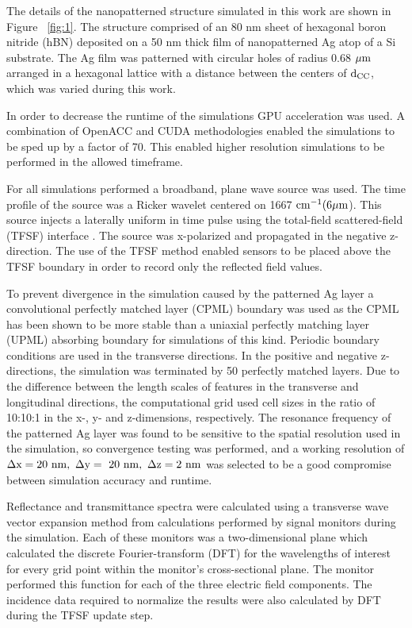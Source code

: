 \documentclass[12pt]{report}
\begin{document}
    The details of the nanopatterned structure simulated in this work are shown in Figure ~\ref{fig:1}. The structure comprised of an 80 nm sheet of hexagonal boron nitride (hBN) deposited on a 50 nm thick film of nanopatterned Ag atop of a Si substrate. The Ag film was patterned with circular holes of radius 0.68 $\rm \mu m$ arranged in a hexagonal lattice with a distance between the centers of $\rm d_{CC}$, which was varied during this work.

    In order to decrease the runtime of the simulations GPU acceleration was used. A combination of OpenACC and CUDA \cite{PGI:20} methodologies enabled the simulations to be sped up by a factor of 70. This enabled higher resolution simulations to be performed in the allowed timeframe.

    For all simulations performed a broadband, plane wave source was used. The time profile of the source was a Ricker wavelet \cite{Ricker:43} centered on 1667 $\rm cm^{-1} (6  \mu m$). This source injects a laterally uniform in time pulse using the total-field scattered-field (TFSF) interface \cite{Merewether:80}. The source was x-polarized and propagated in the negative z-direction. The use of the TFSF method enabled sensors to be placed above the TFSF boundary in order to record only the reflected field values.
    
    To prevent divergence in the simulation caused by the patterned Ag layer a convolutional perfectly matched layer (CPML) \cite{Gvozdic:17} boundary was used as the CPML has been shown to be more stable than a uniaxial perfectly matching layer (UPML) \cite{Sacks:95} absorbing boundary for simulations of this kind. Periodic boundary conditions are used in the transverse directions. In the positive and negative z-directions, the simulation was terminated by 50 perfectly matched layers. Due to the difference between the length scales of features in the transverse and longitudinal directions, the computational grid used cell sizes in the ratio of 10:10:1 in the x-, y- and z-dimensions, respectively. The resonance frequency of the patterned Ag layer was found to be sensitive to the spatial resolution used in the simulation, so convergence testing was performed, and a working resolution of $\rm \Delta x = 20 \  nm, \ \Delta y = \ 20 \ nm, \ \Delta z = 2 \ nm$ was selected to be a good compromise between simulation accuracy and runtime.

    Reflectance and transmittance spectra were calculated using a transverse wave vector expansion method from calculations performed by signal monitors during the simulation. Each of these monitors was a two-dimensional plane which calculated the discrete Fourier-transform (DFT) for the wavelengths of interest for every grid point within the monitor’s cross-sectional plane. The monitor performed this function for each of the three electric field components. The incidence data required to normalize the results were also calculated by DFT during the TFSF update step.
\end{document}
